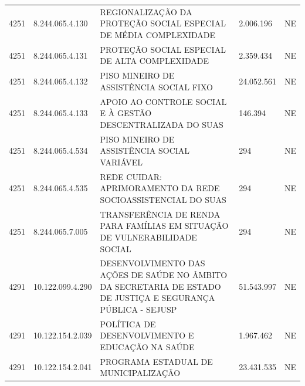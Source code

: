 \documentclass{article}
\begin{document}
\begin{longtable}[c]{m{1cm}|m{2cm}|m{10cm}|m{2cm}|m{1cm}}
\multicolumn{1}{C{1cm}|}{4251} & \multicolumn{1}{C{2cm}|}{8.244.065.4.130} & \multicolumn{1}{L{10cm}|}{REGIONALIZAÇÃO DA PROTEÇÃO SOCIAL ESPECIAL DE MÉDIA COMPLEXIDADE} & \multicolumn{1}{R{2cm}|}{2.006.196} & \multicolumn{1}{C{1cm}}{NE} \\
\multicolumn{1}{C{1cm}|}{4251} & \multicolumn{1}{C{2cm}|}{8.244.065.4.131} & \multicolumn{1}{L{10cm}|}{PROTEÇÃO SOCIAL ESPECIAL DE ALTA COMPLEXIDADE} & \multicolumn{1}{R{2cm}|}{2.359.434} & \multicolumn{1}{C{1cm}}{NE} \\
\multicolumn{1}{C{1cm}|}{4251} & \multicolumn{1}{C{2cm}|}{8.244.065.4.132} & \multicolumn{1}{L{10cm}|}{PISO MINEIRO DE ASSISTÊNCIA SOCIAL FIXO} & \multicolumn{1}{R{2cm}|}{24.052.561} & \multicolumn{1}{C{1cm}}{NE} \\
\multicolumn{1}{C{1cm}|}{4251} & \multicolumn{1}{C{2cm}|}{8.244.065.4.133} & \multicolumn{1}{L{10cm}|}{APOIO AO CONTROLE SOCIAL E À GESTÃO DESCENTRALIZADA DO SUAS} & \multicolumn{1}{R{2cm}|}{146.394} & \multicolumn{1}{C{1cm}}{NE} \\
\multicolumn{1}{C{1cm}|}{4251} & \multicolumn{1}{C{2cm}|}{8.244.065.4.534} & \multicolumn{1}{L{10cm}|}{PISO MINEIRO DE ASSISTÊNCIA SOCIAL VARIÁVEL} & \multicolumn{1}{R{2cm}|}{294} & \multicolumn{1}{C{1cm}}{NE} \\
\multicolumn{1}{C{1cm}|}{4251} & \multicolumn{1}{C{2cm}|}{8.244.065.4.535} & \multicolumn{1}{L{10cm}|}{REDE CUIDAR: APRIMORAMENTO DA REDE SOCIOASSISTENCIAL DO SUAS} & \multicolumn{1}{R{2cm}|}{294} & \multicolumn{1}{C{1cm}}{NE} \\
\multicolumn{1}{C{1cm}|}{4251} & \multicolumn{1}{C{2cm}|}{8.244.065.7.005} & \multicolumn{1}{L{10cm}|}{TRANSFERÊNCIA DE RENDA PARA FAMÍLIAS EM SITUAÇÃO DE VULNERABILIDADE SOCIAL} & \multicolumn{1}{R{2cm}|}{294} & \multicolumn{1}{C{1cm}}{NE} \\
\multicolumn{1}{C{1cm}|}{4291} & \multicolumn{1}{C{2cm}|}{10.122.099.4.290} & \multicolumn{1}{L{10cm}|}{DESENVOLVIMENTO DAS AÇÕES DE SAÚDE NO ÂMBITO DA SECRETARIA DE ESTADO DE JUSTIÇA E SEGURANÇA PÚBLICA - SEJUSP} & \multicolumn{1}{R{2cm}|}{51.543.997} & \multicolumn{1}{C{1cm}}{NE} \\
\multicolumn{1}{C{1cm}|}{4291} & \multicolumn{1}{C{2cm}|}{10.122.154.2.039} & \multicolumn{1}{L{10cm}|}{POLÍTICA DE DESENVOLVIMENTO E EDUCAÇÃO NA SAÚDE} & \multicolumn{1}{R{2cm}|}{1.967.462} & \multicolumn{1}{C{1cm}}{NE} \\
\multicolumn{1}{C{1cm}|}{4291} & \multicolumn{1}{C{2cm}|}{10.122.154.2.041} & \multicolumn{1}{L{10cm}|}{PROGRAMA ESTADUAL DE MUNICIPALIZAÇÃO} & \multicolumn{1}{R{2cm}|}{23.431.535} & \multicolumn{1}{C{1cm}}{NE} \\

\end{longtable}
\end{document}
